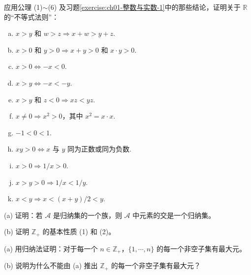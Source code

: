 \documentclass[../../main.tex]{subfiles}
\begin{document}
\begin{exercise}\label{exercise:ch01-整数与实数-2}
应用公理 (1)$\sim$(6) 及习题\cref{exercise:ch01-整数与实数-1}中的那些结论，证明关于 $\mathbb{R}$ 的“不等式法则”：
\begin{enumerate}[(a)]
\item $x > y$ 和 $w > z \Longrightarrow x + w > y + z$.
\item $x > 0$ 和 $y > 0 \Longrightarrow x + y > 0$ 和 $x \cdot y > 0$.
\item $x > 0 \Longleftrightarrow -x < 0$.
\item $x > y \Longleftrightarrow -x < -y$.
\item $x > y$ 和 $z < 0 \Longrightarrow xz < yz$.
\item $x \neq 0 \Longrightarrow x^{2} > 0$，其中 $x^{2} = x \cdot x$.
\item $-1 < 0 < 1$.
\item $xy > 0 \Longleftrightarrow x$ 与 $y$ 同为正数或同为负数.
\item $x > 0 \Longrightarrow 1/x > 0$.
\item $x > y > 0 \Longrightarrow 1/x < 1/y$.
\item $x < y \Longrightarrow x < (x + y)/2 < y$.
\end{enumerate}
\end{exercise}

\begin{exercise}\label{exercise:ch01-整数与实数-3}
(a) 证明：若 $\mathcal{A}$ 是归纳集的一个族，则 $\mathcal{A}$ 中元素的交是一个归纳集。

(b) 证明 $\mathbb{Z}_{+}$ 的基本性质 (1) 和 (2)。
\end{exercise}

\begin{exercise}\label{exercise:ch01-整数与实数-4}
(a) 用归纳法证明：对于每一个 $n \in \mathbb{Z}_{+}$，$\{1, \cdots, n\}$ 的每一个非空子集有最大元。

(b) 说明为什么不能由 (a) 推出 $\mathbb{Z}_{+}$ 的每一个非空子集有最大元？
\end{exercise}
\end{document}
